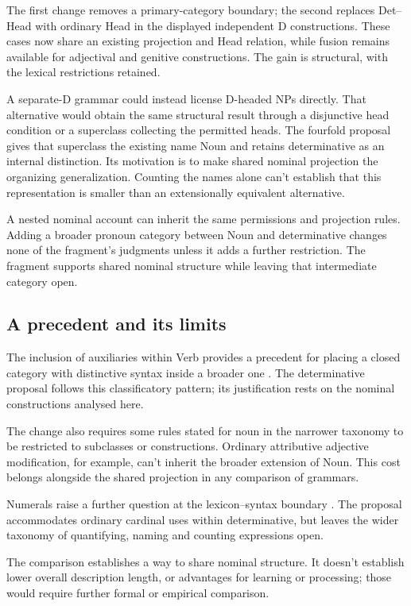 \documentclass[12pt]{article}
\begin{document}
The first change removes a primary-category boundary; the second replaces Det--Head with ordinary Head in the displayed independent D constructions. These cases now share an existing projection and Head relation, while fusion remains available for adjectival and genitive constructions. The gain is structural, with the lexical restrictions retained.

A separate-D grammar could instead license D-headed NPs directly. That alternative would obtain the same structural result through a disjunctive head condition or a superclass collecting the permitted heads. The fourfold proposal gives that superclass the existing name Noun and retains determinative as an internal distinction. Its motivation is to make shared nominal projection the organizing generalization. Counting the names alone can't establish that this representation is smaller than an extensionally equivalent alternative.

A nested nominal account can inherit the same permissions and projection rules. Adding a broader pronoun category between Noun and determinative changes none of the fragment's judgments unless it adds a further restriction. The fragment supports shared nominal structure while leaving that intermediate category open.

\subsection{A precedent and its limits}

The inclusion of auxiliaries within Verb provides a precedent for placing a closed category with distinctive syntax inside a broader one \citep{pullumwilson1977}. The determinative proposal follows this classificatory pattern; its justification rests on the nominal constructions analysed here.

The change also requires some rules stated for noun in the narrower taxonomy to be restricted to subclasses or constructions. Ordinary attributive adjective modification, for example, can't inherit the broader extension of Noun. This cost belongs alongside the shared projection in any comparison of grammars.

Numerals raise a further question at the lexicon--syntax boundary \citep{reynolds2026numerals}. The proposal accommodates ordinary cardinal uses within determinative, but leaves the wider taxonomy of quantifying, naming and counting expressions open.

The comparison establishes a way to share nominal structure. It doesn't establish lower overall description length, or advantages for learning or processing; those would require further formal or empirical comparison.
\end{document}

